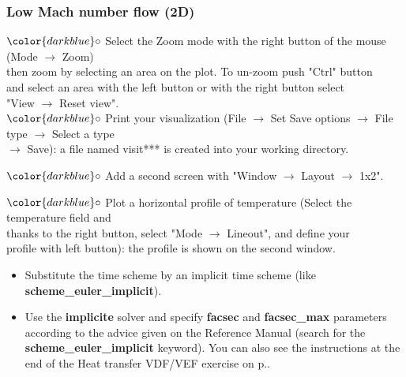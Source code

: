 \documentclass[10pt, hyperref={unicode=true,pdfusetitle, bookmarks=true,bookmarksnumbered=false,bookmarksopen=false, breaklinks=false,pdfborder={0 0 1},backref=true,colorlinks=true,linkcolor=darkblue,pageanchor}]{beamer}
\begin{document}
\begin{frame}
\frametitle{Low Mach number flow (2D)}
\begin{block}{}

\hspace{1cm} $\color{darkblue}\circ$ {\small{Select the Zoom mode with the right button of the mouse (Mode $\rightarrow$ Zoom) \\
\hspace{1.3cm}  then zoom by selecting an area on the plot. To un-zoom push "Ctrl" button \\
\hspace{1.3cm}  and select an area with the left button or with the right button select \\
\hspace{1.3cm}  "View $\rightarrow$ Reset view".}}\\
\hspace{1cm} $\color{darkblue}\circ$ {\small{Print your visualization (File $\rightarrow$ Set Save options $\rightarrow$ File type $\rightarrow$ Select a type \\
\hspace{1.3cm}  $\rightarrow$ Save): a file named visit*** is created into your working directory.}}

\hspace{1cm} $\color{darkblue}\circ$ {\small{Add a second screen with "Window $\rightarrow$ Layout $\rightarrow$ 1x2".}}

\hspace{1cm} $\color{darkblue}\circ$ {\small{Plot a horizontal profile of temperature  (Select the temperature field and \\
\hspace{1.3cm} thanks to the right button, select "Mode $\rightarrow$ Lineout", and define your \\
\hspace{1.3cm} profile with left button): the profile is shown on the second window.}}

\begin{itemize}
\item Substitute the time scheme by an implicit time scheme (like \textbf{scheme\_euler\_implicit}). 

\item Use the \textbf{implicite} solver and specify \textbf{facsec} and \textbf{facsec\_max} parameters according to the advice given on the Reference Manual (search for the \textbf{scheme\_euler\_implicit} keyword). You can also see the instructions at the end of the Heat transfer VDF/VEF exercise on p.\pageref{schema_impl}.
\end{itemize}

\end{block}
\end{frame}
\end{document}
